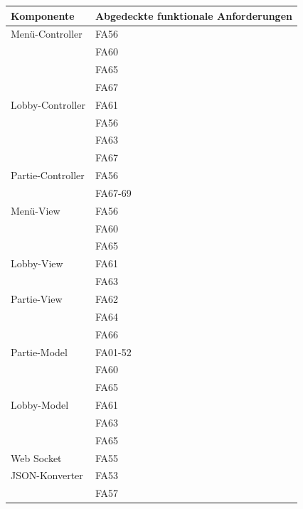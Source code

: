 \begin{center}
    \begin{tabular}{|l|l|}
        \hline
        \textbf{Komponente} & \textbf{Abgedeckte funktionale Anforderungen}\\ \hline
        Menü-Controller & FA56 \\ 
        & FA60 \\
        & FA65 \\
        & FA67 \\ \hline
    
        Lobby-Controller & FA61 \\
        & FA56 \\
        & FA63 \\
        & FA67 \\ \hline
    
        Partie-Controller & FA56 \\
        &  FA67-69 \\
    
        Menü-View & FA56 \\ 
        & FA60 \\
        & FA65 \\ \hline
    
        Lobby-View & FA61 \\ 
        & FA63 \\ \hline
    
        Partie-View & FA62 \\ 
        & FA64 \\ 
        & FA66 \\ \hline
    
        Partie-Model & FA01-52 \\ 
        & FA60 \\
        & FA65 \\ \hline
    
        Lobby-Model & FA61 \\ 
        & FA63 \\
        & FA65 \\ \hline
    
        Web Socket & FA55 \\ \hline
    
        JSON-Konverter & FA53 \\
        & FA57\\ \hline
    \end{tabular}	
\end{center}

